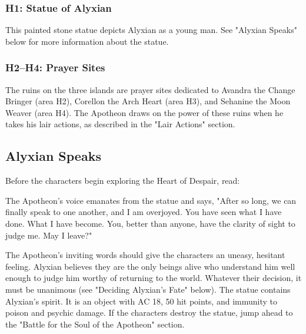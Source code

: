 \documentclass[10pt,a4,twoside,twocolumn,openany,nodeprecatedcode]{dndbook}
\begin{document}
\subsubsection{H1: Statue of Alyxian}
This painted stone statue depicts Alyxian as a young man. See "Alyxian Speaks" below for more information about the statue.
\subsubsection{H2–H4: Prayer Sites}
The ruins on the three islands are prayer sites dedicated to Avandra the Change Bringer (area H2), Corellon the Arch Heart (area H3), and Sehanine the Moon Weaver (area H4). The Apotheon draws on the power of these ruins when he takes his lair actions, as described in the "Lair Actions" section.
\subsection{Alyxian Speaks}
Before the characters begin exploring the Heart of Despair, read:
\begin{DndReadAloud}{}
The Apotheon's voice emanates from the statue and says, "After so long, we can finally speak to one another, and I am overjoyed. You have seen what I have done. What I have become. You, better than anyone, have the clarity of sight to judge me. May I leave?"
\end{DndReadAloud}

The Apotheon's inviting words should give the characters an uneasy, hesitant feeling. Alyxian believes they are the only beings alive who understand him well enough to judge him worthy of returning to the world. Whatever their decision, it must be unanimous (see "Deciding Alyxian's Fate" below).
The statue contains Alyxian's spirit. It is an object with AC 18, 50 hit points, and immunity to poison and psychic damage. If the characters destroy the statue, jump ahead to the "Battle for the Soul of the Apotheon" section.
\end{document}
